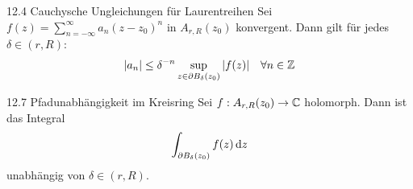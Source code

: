 \begin{satz}{12.4 Cauchysche Ungleichungen für Laurentreihen}
Sei $f(z) = \sum_{n=-\infty}^\infty a_n (z-z_0)^n$ in $A_{r,R}(z_0)$ konvergent. Dann gilt für jedes $\delta \in (r, R)$:
\[
    |a_n| \le \delta^{-n} \sup_{z \in \partial B_\delta(z_0)} |f(z)| \quad \forall n \in \mathbb{Z}
\]
\end{satz}

\begin{satz}{12.7 Pfadunabhängigkeit im Kreisring}
Sei $f: A_{r,R}(z_0) \to \mathbb{C}$ holomorph. Dann ist das Integral
\[
    \int_{\partial B_\delta(z_0)} f(z) \, \mathrm{d}z
\]
unabhängig von $\delta \in (r, R)$.
\end{satz}